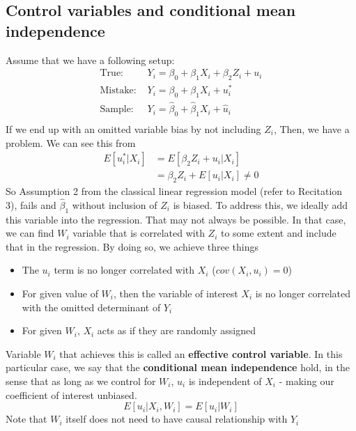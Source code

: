\documentclass[12pt]{article}
\theoremstyle{definition}
\theoremstyle{property}
\theoremstyle{assumption}
\theoremstyle{example}
\theoremstyle{comment}
\begin{document}
\subsection{Control variables and conditional mean independence}
Assume that we have a following setup:
\[
\begin{aligned}
\text{True: }& Y_i = \beta_0 + \beta_1 X_i + \beta_2 Z_i+u_i\\
\text{Mistake: }& Y_i = \beta_0 + \beta_1 X_i + u_i^*\\
\text{Sample: }& Y_i = \hat{\beta}_0 + \hat{\beta}_1 X_i+ \hat{u}_i\\
\end{aligned}
\]
If we end up with an omitted variable bias by not including $Z_i$, Then, we have a problem. We can see this from
\[
\begin{aligned}
E[u_i^*|X_i]&=E[\beta_2Z_i+u_i|X_i]\\
&=\beta_2Z_i+E[u_i|X_i] \neq 0
\end{aligned}
\]
So Assumption 2 from the classical linear regression model (refer to Recitation 3), fails and $\hat{\beta}_1$ without inclusion of $Z_i$ is biased. To address this, we ideally add this variable into the regression. That may not always be possible. In that case, we can find $W_i$ variable that is correlated with $Z_i$ to some extent and include that in the regression. By doing so, we achieve three things
\begin{itemize}
\item The $u_i$ term is no longer correlated with $X_i$ ($cov(X_i, u_i)=0$)
\item For given value of $W_i$, then the variable of interest $X_i$ is no longer correlated with the omitted determinant of $Y_i$
\item For given $W_i$, $X_i$ acts as if they are randomly assigned
\end{itemize}
Variable $W_i$ that achieves this is called an \textbf{effective control variable}. In this particular case, we say that the \textbf{conditional mean independence} hold, in the sense that as long as we control for $W_i$, $u_i$ is independent of $X_i$ - making our coefficient of interest unbiased. 
\[
E[u_i|X_i,W_i]= E[u_i|W_i]
\]
Note that $W_i$ itself does not need to have causal relationship with $Y_i$


\end{document}
